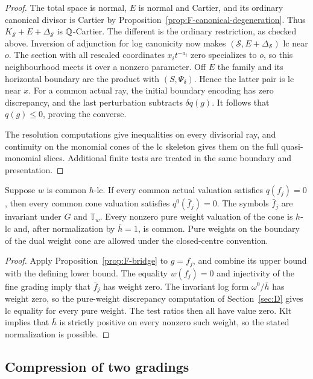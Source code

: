 \begin{proof}
The total space is normal, $E$ is normal and Cartier, and its
ordinary canonical divisor is Cartier by
Proposition~\ref{prop:F-canonical-degeneration}.  Thus
$K_{\mathcal S}+E+\Delta_{\mathcal S}$ is $\mathbb Q$-Cartier.
The different is the ordinary restriction, as checked above.
Inversion of adjunction for log canonicity
\citep[Theorem]{Kawakita} now makes
$(\mathcal S,E+\Delta_{\mathcal S})$ lc near $o$.
The section with all rescaled coordinates $x_i t^{-a_i}$ zero
specializes to $o$, so this neighbourhood meets it over a
nonzero parameter.  Off $E$ the family and its horizontal
boundary are the product with $(S,\Psi_\delta)$.  Hence the latter
pair is lc near $x$.
For a common actual ray, the initial boundary encoding has zero
discrepancy, and the last perturbation subtracts $\delta q(g)$.
It follows that $q(g)\le0$, proving the converse.

The resolution computations give inequalities on every divisorial
ray, and continuity on the monomial cones of the lc skeleton
gives them on the full quasi-monomial slices.  Additional finite
tests are treated in the same boundary and presentation.
\end{proof}

\begin{corollary}
\label{cor:F-exact-tests}
Suppose $w$ is common $h$-lc. If every common actual valuation
satisfies $q(f_j)=0$, then every common cone valuation satisfies
$q^0(\bar f_j)=0$.
The symbols $\bar f_j$ are invariant under $G$ and $\mathbb T_w$.
Every nonzero pure weight valuation of the cone is $h$-lc and,
after normalization by $\bar h=1$, is common.  Pure weights on
the boundary of the dual weight cone are allowed under the
closed-centre convention.
\end{corollary}

\begin{proof}
Apply Proposition~\ref{prop:F-bridge} to $g=f_j$, and combine its
upper bound with the defining lower bound.  The equality
$w(f_j)=0$ and injectivity of the fine grading imply that
$\bar f_j$ has weight zero.  The invariant log form
$\omega^0/\bar h$ has weight zero, so the pure-weight discrepancy
computation of Section~\ref{sec:D} gives lc equality for every
pure weight.  The test ratios then all have value zero.  Klt
implies that $\bar h$ is strictly positive on every nonzero
such weight, so the stated normalization is possible.
\end{proof}

\subsection{Compression of two gradings}

